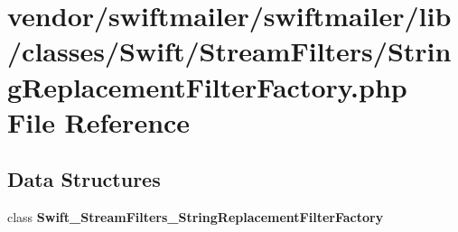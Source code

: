 \section{vendor/swiftmailer/swiftmailer/lib/classes/\+Swift/\+Stream\+Filters/\+String\+Replacement\+Filter\+Factory.php File Reference}
\label{_string_replacement_filter_factory_8php}
\subsection*{Data Structures}
\begin{DoxyCompactItemize}
\item 
class {\bf Swift\+\_\+\+Stream\+Filters\+\_\+\+String\+Replacement\+Filter\+Factory}
\end{DoxyCompactItemize}
